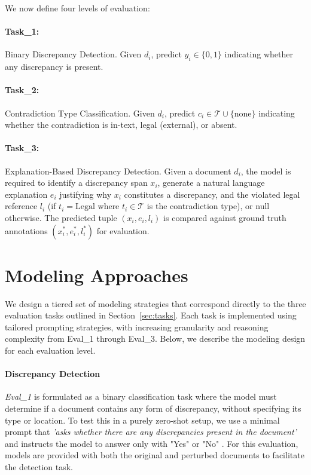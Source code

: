 \documentclass[11pt]{article}
\begin{document}
We now define four levels of evaluation:

\paragraph{Task\_1:}
 Binary Discrepancy Detection. Given $d_i$, predict $y_i \in \{0, 1\}$ indicating whether any discrepancy is present.

\paragraph{Task\_2:}
 Contradiction Type Classification. Given $d_i$, predict $c_i \in \mathcal{T} \cup \{\text{none}\}$ indicating whether the contradiction is in-text, legal (external), or absent.

\paragraph{Task\_3:}

Explanation-Based Discrepancy Detection. Given a document $d_i$, the model is required to identify a discrepancy span $x_i$, generate a natural language explanation $e_i$ justifying why $x_i$ constitutes a discrepancy, and the violated legal reference $l_i$ (if $t_i = \text{Legal}$ where $t_i \in \mathcal{T}$ is the contradiction type), or null otherwise. The predicted tuple $(x_i, e_i, l_i)$ is compared against ground truth annotations $(x_i^{*}, e_i^{*}, l_i^{*})$ for evaluation. 
\vspace{-0.2em}
\section{Modeling Approaches}
\vspace{-0.2em}
We design a tiered set of modeling strategies that correspond directly to the three evaluation tasks outlined in Section~\ref{sec:tasks}. Each task is implemented using tailored prompting strategies, with increasing granularity and reasoning complexity from Eval\_1 through Eval\_3. Below, we describe the modeling design for each evaluation level.
\vspace{-0.2em}
\paragraph{Discrepancy Detection}

 \textit{Eval\_1} is formulated as a binary classification task where the model must determine if a document contains any form of discrepancy, without specifying its type or location. To test this in a purely zero-shot setup, we use a minimal prompt that \textit{'asks whether there are any discrepancies present in the document'} and instructs the model to answer only with "Yes" or "No" . For this evaluation, models are provided with both the original and perturbed documents to facilitate the detection task.
\end{document}
